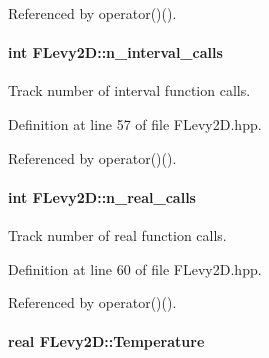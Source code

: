 \-Referenced by operator()().

\hypertarget{classFLevy2D_a3ae9783838856fc26170358ca4989818}{
\paragraph[{n\-\_\-interval\-\_\-calls}]{\setlength{\rightskip}{0pt plus 5cm}int {\bf \-F\-Levy2\-D\-::n\-\_\-interval\-\_\-calls}}}\label{classFLevy2D_a3ae9783838856fc26170358ca4989818}


\-Track number of interval function calls. 



\-Definition at line 57 of file \-F\-Levy2\-D.\-hpp.



\-Referenced by operator()().

\hypertarget{classFLevy2D_a9061075d7df97d8cbd182f049b93d404}{
\paragraph[{n\-\_\-real\-\_\-calls}]{\setlength{\rightskip}{0pt plus 5cm}int {\bf \-F\-Levy2\-D\-::n\-\_\-real\-\_\-calls}}}\label{classFLevy2D_a9061075d7df97d8cbd182f049b93d404}


\-Track number of real function calls. 



\-Definition at line 60 of file \-F\-Levy2\-D.\-hpp.



\-Referenced by operator()().

\hypertarget{classFLevy2D_adfc81b0fad00fd255954e5f0a6ae786a}{
\paragraph[{\-Temperature}]{\setlength{\rightskip}{0pt plus 5cm}real {\bf \-F\-Levy2\-D\-::\-Temperature}}}\label{classFLevy2D_adfc81b0fad00fd255954e5f0a6ae786a}


